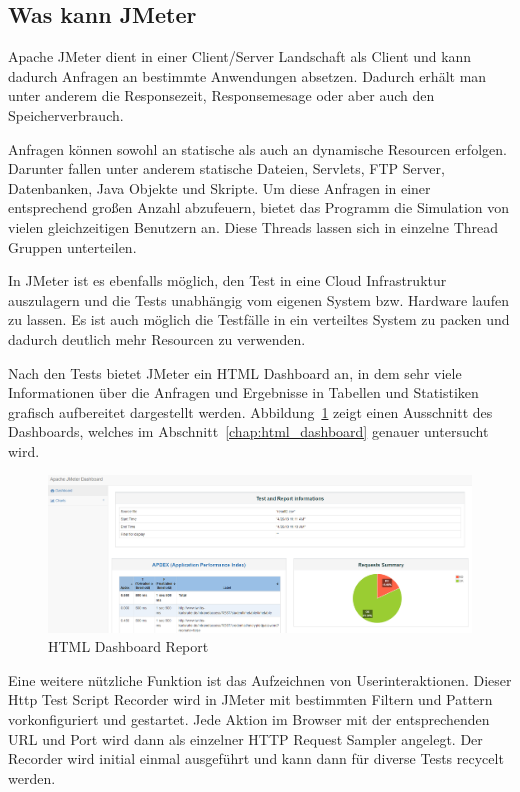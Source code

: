 \documentclass[a4paper,12pt]{article}
\begin{document}
\subsection{Was kann JMeter}
Apache JMeter dient in einer Client/Server Landschaft als Client und kann dadurch Anfragen an bestimmte Anwendungen absetzen. Dadurch erhält man unter anderem die Responsezeit, Responsemesage oder aber auch den Speicherverbrauch.

Anfragen können sowohl an statische als auch an dynamische Resourcen erfolgen. Darunter fallen unter anderem statische Dateien, Servlets, FTP Server, Datenbanken, Java Objekte und Skripte.
Um diese Anfragen in einer entsprechend großen Anzahl abzufeuern, bietet das Programm die Simulation von vielen gleichzeitigen Benutzern an. Diese Threads lassen sich in einzelne Thread Gruppen unterteilen.

In JMeter ist es ebenfalls möglich, den Test in eine Cloud Infrastruktur auszulagern und die Tests unabhängig vom eigenen System bzw. Hardware laufen zu lassen.  Es ist auch möglich die Testfälle in ein verteiltes System zu packen und dadurch deutlich mehr Resourcen zu verwenden. 

Nach den Tests bietet JMeter ein HTML Dashboard an, in dem sehr viele Informationen über die Anfragen und Ergebnisse in Tabellen und Statistiken grafisch aufbereitet dargestellt werden. Abbildung~\ref{fig:dashboard} zeigt einen Ausschnitt des Dashboards, welches im Abschnitt~\ref{chap:html_dashboard} genauer untersucht wird.  

\begin{figure}[htb]%
 \centering
    \includegraphics[width=1\textwidth]{bilder/dashboard.png}
  \caption{HTML Dashboard Report}
  \label{fig:dashboard}
\end{figure}

Eine weitere nützliche Funktion ist das Aufzeichnen von Userinteraktionen. Dieser Http Test Script Recorder wird in JMeter mit bestimmten Filtern und Pattern vorkonfiguriert und gestartet. Jede Aktion im Browser mit der entsprechenden URL und Port wird dann als einzelner HTTP Request Sampler angelegt. Der Recorder wird initial einmal ausgeführt und kann dann für diverse Tests recycelt werden.    
\end{document}
